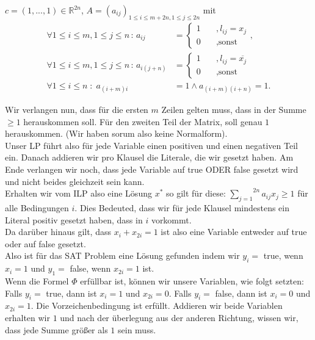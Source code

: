 \documentclass[11pt,a4paper,ngerman]{article}
\begin{document}
$c = (1 , ... , 1) \in \mathbb{R}^{2n}$,
$A = (a_{ij})_{1 \leq i \leq m+2n, 1 \leq j \leq 2n}$
mit 
\begin{equation*}\begin{split}
\forall 1 \leq i \leq m, 1 \leq j \leq n \, : \, a_{ij} &= \left \{ \begin{array}{rl} 1 \quad &, l_{ij} = x_j \\ 0 &, \text{sonst}\end{array}\right. ,\\
\forall 1 \leq i \leq m, 1 \leq j \leq n \, : \, a_{i(j+n)} &= \left \{\begin{array}{rl} 1 \quad &, l_{ij} = \overline{x_j} \\ 0 &, \text{sonst}\end{array}\right. \\
\forall 1 \leq i \leq n \; : \; a_{(i+m)i} &= 1 \land a_{(i+m)(i+n)} = 1.
\end{split}\end{equation*}

Wir verlangen nun, dass für die ersten $m$ Zeilen gelten muss, dass in der Summe $\geq 1$ herauskommen soll.
Für den zweiten Teil der Matrix, soll genau $1$ herauskommen. (Wir haben sorum also keine Normalform).\\

Unser LP führt also für jede Variable einen positiven und einen negativen Teil ein.
Danach addieren wir pro Klausel die Literale, die wir gesetzt haben.
Am Ende verlangen wir noch, dass jede Variable auf true ODER false gesetzt wird und nicht beides
gleichzeit sein kann.\\

Erhalten wir vom ILP also eine Lösung $x^*$ so gilt für diese:
$\overset{2n}{\underset{j=1}{\sum}} a_{ij}x_j \geq 1$ für alle Bedingungen $i$.
Dies Bedeuted, dass wir für jede Klausel mindestens ein Literal positiv gesetzt haben,
dass in $i$ vorkommt.\\
Da darüber hinaus gilt, dass $x_i + x_{2i} = 1$ ist also eine Variable entweder auf true oder auf false gesetzt.\\
Also ist für das SAT Problem eine Lösung gefunden indem wir $y_i =$ true, wenn $x_i = 1$ und $y_1 =$ false, wenn $x_{2i} = 1$ ist.\\

Wenn die Formel $\Phi$ erfüllbar ist, können wir unsere Variablen,
wie folgt setzten: Falls $y_i = $ true, dann ist $x_i = 1$ und $x_{2i} = 0$. Falls $y_i = $ false, dann ist $x_i = 0$ und $x_{2i} = 1$.
Die Vorzeichenbedingung ist erfüllt. Addieren wir beide Variablen erhalten wir $1$ und nach
der überlegung aus der anderen Richtung, wissen wir, dass jede Summe größer als $1$ sein muss.\\
\end{document}
